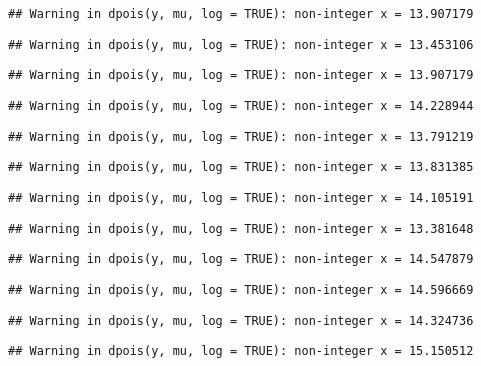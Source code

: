 \documentclass[
]{article}
\begin{document}
\begin{verbatim}
## Warning in dpois(y, mu, log = TRUE): non-integer x = 13.907179
\end{verbatim}

\begin{verbatim}
## Warning in dpois(y, mu, log = TRUE): non-integer x = 13.453106
\end{verbatim}

\begin{verbatim}
## Warning in dpois(y, mu, log = TRUE): non-integer x = 13.907179
\end{verbatim}

\begin{verbatim}
## Warning in dpois(y, mu, log = TRUE): non-integer x = 14.228944
\end{verbatim}

\begin{verbatim}
## Warning in dpois(y, mu, log = TRUE): non-integer x = 13.791219
\end{verbatim}

\begin{verbatim}
## Warning in dpois(y, mu, log = TRUE): non-integer x = 13.831385
\end{verbatim}

\begin{verbatim}
## Warning in dpois(y, mu, log = TRUE): non-integer x = 14.105191
\end{verbatim}

\begin{verbatim}
## Warning in dpois(y, mu, log = TRUE): non-integer x = 13.381648
\end{verbatim}

\begin{verbatim}
## Warning in dpois(y, mu, log = TRUE): non-integer x = 14.547879
\end{verbatim}

\begin{verbatim}
## Warning in dpois(y, mu, log = TRUE): non-integer x = 14.596669
\end{verbatim}

\begin{verbatim}
## Warning in dpois(y, mu, log = TRUE): non-integer x = 14.324736
\end{verbatim}

\begin{verbatim}
## Warning in dpois(y, mu, log = TRUE): non-integer x = 15.150512
\end{verbatim}
\end{document}
